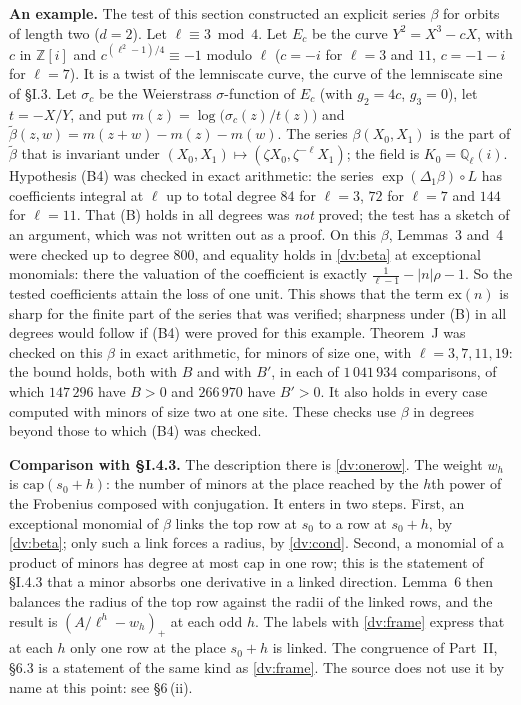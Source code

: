 \documentclass[11pt,letterpaper]{article}
\newcommand{\Z}{\mathbb Z}\newcommand{\Q}{\mathbb Q}\newcommand{\C}{\mathbb C}
\begin{document}
\textbf{An example.} The test of this section constructed an explicit series $\beta$ for orbits of length
two ($d=2$). Let $\ell\equiv3\bmod4$. Let $E_c$ be the curve $Y^2=X^3-cX$, with $c$ in $\Z[i]$ and
$c^{(\ell^2-1)/4}\equiv-1$ modulo $\ell$ ($c=-i$ for $\ell=3$ and $11$, $c=-1-i$ for $\ell=7$). It is a twist
of the lemniscate curve, the curve of the lemniscate sine of \S I.3. Let $\sigma_c$ be the Weierstrass
$\sigma$-function of $E_c$ (with $g_2=4c$, $g_3=0$), let $t=-X/Y$, and put
$m(z)=\log\big(\sigma_c(z)/t(z)\big)$ and $\tilde\beta(z,w)=m(z+w)-m(z)-m(w)$. The series $\beta(X_0,X_1)$ is
the part of $\tilde\beta$ that is invariant under $(X_0,X_1)\mapsto(\zeta X_0,\zeta^{-\ell}X_1)$; the field
is $K_0=\Q_\ell(i)$. Hypothesis (B4) was checked in exact arithmetic: the series $\exp(\Delta_1\beta)\circ L$ has
coefficients integral at $\ell$ up to total degree $84$ for $\ell=3$, $72$ for $\ell=7$ and $144$ for
$\ell=11$. That (B) holds in all degrees was \emph{not} proved; the test has a sketch of an argument, which
was not written out as a proof. On this $\beta$, Lemmas~3 and~4 were checked up to degree $800$, and
equality holds in \eqref{dv:beta} at exceptional monomials: there the valuation of the coefficient is
exactly $\frac1{\ell-1}-|n|\rho-1$. So the tested coefficients attain the loss of one unit. This shows that the term $\mathrm{ex}(n)$ is sharp for the finite part of the series that was verified; sharpness under (B) in all degrees would follow if (B4) were proved for this example. Theorem~J was checked on
this $\beta$ in exact arithmetic, for minors of size one, with $\ell=3,7,11,19$: the bound holds, both with
$B$ and with $B'$, in each of $1\,041\,934$ comparisons, of which $147\,296$ have $B>0$ and $266\,970$ have
$B'>0$. It also holds in every case computed with minors of size two at one site. These checks use $\beta$
in degrees beyond those to which (B4) was checked.

\textbf{Comparison with \S I.4.3.} The description there is \eqref{dv:onerow}. The weight $w_h$ is
$\mathrm{cap}(s_0+h)$: the number of minors at the place reached by the $h$th power of the Frobenius
composed with conjugation. It enters in two steps. First, an exceptional monomial of $\beta$ links the top
row at $s_0$ to a row at $s_0+h$, by \eqref{dv:beta}; only such a link forces a radius, by \eqref{dv:cond}.
Second, a monomial of a product of minors has degree at most $\mathrm{cap}$ in one row; this is the
statement of \S I.4.3 that a minor absorbs one derivative in a linked direction. Lemma~6 then balances the
radius of the top row against the radii of the linked rows, and the result is $(A/\ell^h-w_h)_+$ at each
odd $h$. The labels with \eqref{dv:frame} express that at each $h$ only one row at the place $s_0+h$ is
linked. The congruence of Part~II, \S6.3 is a statement of the same kind as \eqref{dv:frame}. The source does not
use it by name at this point: see \S6\,(ii).
\end{document}
